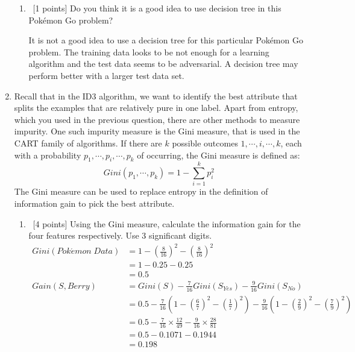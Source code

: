 \begin{enumerate}
\begin{enumerate}
\item   ~[1 points]  Do you think it is a good idea to use decision tree in this Pok\'emon Go problem?

It is not a good idea to use a decision tree for this particular Pok\'emon Go problem. The training data looks to be not enough for a learning algorithm and the test data seems to be adversarial. A decision tree may perform better with a larger test data set.

\end{enumerate}
\item Recall that in the ID3 algorithm, we want to identify the best
  attribute that splits the examples that are relatively pure in one
  label. Apart from entropy, which you used in the previous question,
  there are other methods to measure impurity. One such impurity
  measure is the Gini measure, that is used in the CART family of
  algorithms. If there are $k$ possible outcomes
  $1,\cdots, i, \cdots, k$, each with a probability
  $p_1, \cdots, p_i, \cdots, p_k$ of occurring, the Gini measure is
  defined as:
\begin{equation*}
Gini(p_1, \cdots, p_k) =   1 - \sum_{i=1}^k p_i^2
\end{equation*}
The Gini measure can be used to replace entropy in the definition of information gain to pick the best attribute.
\begin{enumerate}
\item ~[4 points] Using the Gini measure, calculate the information gain for the four features respectively. Use 3 significant digits. \\
\begin{align*} 
Gini(Pok\acute emon \; Data) &= 1 - \left ( \frac{8}{16} \right ) ^ 2 - \left ( \frac{8}{16} \right ) ^ 2\\
&= 1 - 0.25 - 0.25\\
&= 0.5\\
Gain(S, Berry) &= Gini(S) -\frac{7}{16} Gini(S_{Yes}) -\frac{9}{16} Gini(S_{No}) \\
&= 0.5 - \frac{7}{16} \left( 1 - \left( \frac{6}{7} \right) ^2 - \left( \frac{1}{7} \right) ^2 \right) - \frac{9}{16} \left( 1 - \left( \frac{2}{9} \right) ^2 - \left( \frac{7}{9} \right) ^2 \right) \\
&= 0.5 - \frac{7}{16} \times \frac{12}{49}  - \frac{9}{16} \times \frac{28}{81} \\
&= 0.5 - 0.1071 - 0.1944\\
&=0.198
\end{align*}
\begin{align*} 

\end{align*}
\end{enumerate}
\end{enumerate}
